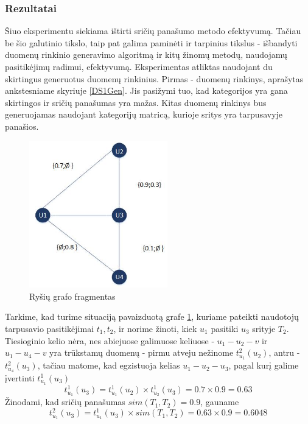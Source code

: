 \documentclass{VUMIFInfMagistrinis}
\begin{document}
\subsubsection{Rezultatai}
Šiuo eksperimentu siekiama ištirti sričių panašumo metodo efektyvumą. Tačiau be šio galutinio tikslo, taip pat galima paminėti ir tarpinius tikslus - išbandyti duomenų rinkinio generavimo algoritmą ir kitų žinomų metodų, naudojamų pasitikėjimų radimui, efektyvumą.
\newline
\indent
Eksperimentas atliktas naudojant du skirtingus generuotus duomenų rinkinius. Pirmas - duomenų rinkinys, aprašytas ankstesniame skyriuje \ref{DS1Gen}. Jis pasižymi tuo, kad kategorijos yra gana skirtingos ir sričių panašumas yra mažas. Kitas duomenų rinkinys bus generuojamas naudojant kategorijų matricą, kurioje sritys yra tarpusavyje panašios. 
\begin{figure}[ht!]
	\centering
	\includegraphics[width=60mm]{multiarea.jpg}
	\caption{Ryšių grafo fragmentas} \label{multiarea}
\end{figure}
Tarkime, kad turime situaciją pavaizduotą grafe \ref{multiarea}, kuriame pateikti naudotojų tarpusavio pasitikėjimai ${t_1, t_2}$, ir norime žinoti, kiek $u_1$ pasitiki $u_3$ srityje $T_2$. Tiesioginio kelio nėra, nes abiejuose galimuose keliuose - $u_1 - u_2 - v$ ir $u_1 - u_4 - v$ yra trūkstamų duomenų - pirmu atveju nežinome $t_{u_1}^2(u_2)$, antru - $t_{u_4}^2(u_3)$, tačiau matome, kad egzistuoja kelias $u_1 - u_2 - u_3$, pagal kurį galime įvertinti $t_{u_1}^1(u_3)$
\begin{displaymath}
t_{u_1}^1(u_3)=t_{u_1}^1(u_2) \times t_{u_2}^1(u_3) = 0.7 \times 0.9 = 0.63
\end{displaymath}
Žinodami, kad sričių panašumas $sim(T_1, T_2) = 0.9$, gauname
\begin{displaymath}
t_{u_1}^2(u_3)=t_{u_1}^1(u_3) \times sim(T_1, T_2) = 0.63 \times 0.9 = 0.6048
\end{displaymath}
\end{document}
